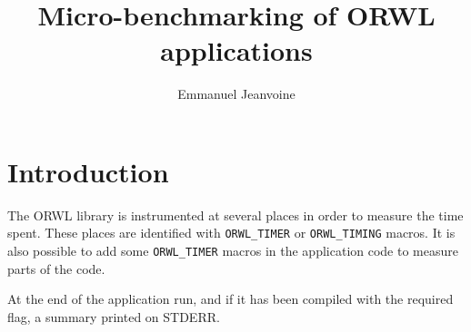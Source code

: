 \documentclass[10pt]{article}
\title{Micro-benchmarking of ORWL applications}
\author{Emmanuel Jeanvoine}
\begin{document}
\maketitle

\section{Introduction}
The ORWL library is instrumented at several places in order to measure
the time spent. These places are identified with \texttt{ORWL\_TIMER}
or \texttt{ORWL\_TIMING} macros. It is also possible to add some
\texttt{ORWL\_TIMER} macros in the application code to measure parts
of the code.

At the end of the application run, and if it has been compiled with
the required flag, a summary printed on STDERR.
\end{document}

